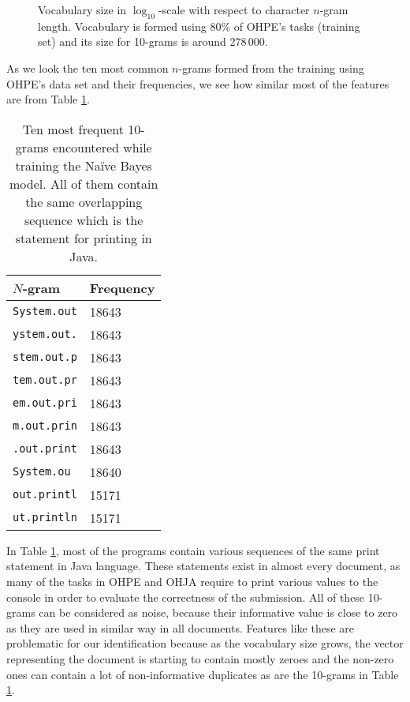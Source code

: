 \newpage

\begin{figure}[ht]
    \centering
    \setlength\figureheight{5cm}
    \setlength{}
    
    \caption{Vocabulary size in $\log_{10}$-scale with respect to character $n$-gram length. Vocabulary is formed using 80\% of OHPE's tasks (training set) and its size for 10-grams is around 278\,000.}
    \label{fig-ai-ohpe-ngram-voc}
\end{figure}


As we look the ten most common $n$-grams formed from the training using OHPE's data set and their frequencies, we see how similar most of the features are from Table \ref{tbl-ai-result-topten-ngrams}. 

\begin{table}[ht]
    \centering
    \caption{Ten most frequent 10-grams encountered while training the Naïve Bayes model. All of them contain the same overlapping sequence which is the statement for printing in Java.}
    \begin{tabular}{|m{4cm}|l|}
    \hline
    \textbf{$N$-gram} & \textbf{Frequency} \\ \hline
    \texttt{System.out}     & 18643              \\ \hline
    \texttt{ystem.out.}     & 18643              \\ \hline
    \texttt{stem.out.p}     & 18643              \\ \hline
    \texttt{tem.out.pr}     & 18643              \\ \hline
    \texttt{em.out.pri}     & 18643              \\ \hline
    \texttt{m.out.prin}     & 18643              \\ \hline
    \texttt{.out.print}     & 18643              \\ \hline
    \texttt{System.ou}      & 18640              \\ \hline
   \texttt{out.printl}     & 15171              \\ \hline
    \texttt{ut.println}     & 15171              \\ \hline
    \end{tabular}
    \label{tbl-ai-result-topten-ngrams}
\end{table}

\noindent
In Table \ref{tbl-ai-result-topten-ngrams}, most of the programs contain various sequences of the same print statement in Java language. These statements exist in almost every document, as many of the tasks in OHPE and OHJA require to print various values to the console in order to evaluate the correctness of the submission. All of these  10-grams can be considered as noise, because their informative value is close to zero as they are used in similar way in all documents. Features like these are problematic for our identification because as the vocabulary size grows, the vector representing the document is starting to contain mostly zeroes and the non-zero ones can contain a lot of non-informative duplicates as are the 10-grams in Table \ref{tbl-ai-result-topten-ngrams}.

